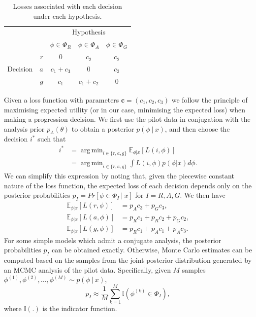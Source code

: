 \documentclass[AMA,STIX1COL]{WileyNJD-v2}
\DeclareMathOperator*{\argmin}{arg\,min}
\begin{document}
\begin{table}
\caption{Losses associated with each decision under each hypothesis.}
\centering
\begin{tabular}{r r c c c}
\toprule
& & \multicolumn{3}{c}{Hypothesis} \\
& & $\phi \in \Phi_{R}$ & $\phi \in \Phi_{A}$ & $\phi \in \Phi_{G}$ \\
\midrule
\multirow{3}{*}{Decision} & $r$ & 0 & $c_{2}$ & $c_{2}$ \\
 & $a$ & $c_{1} + c_{3}$ & 0 & $c_{3}$ \\
 & $g$ & $c_{1}$ & $c_{1} + c_{2}$ & 0  \\
\bottomrule
\end{tabular}
\label{tab:loss}
\end{table}


Given a loss function with parameters $\mathbf{c} = (c_1, c_2, c_3)$ we follow the principle of maximising expected utility (or in our case, minimising the expected loss) when making a progression decision. We first use the pilot data in conjugation with the analysis prior $p_{A}(\theta)$ to obtain a posterior $p(\phi ~|~ x)$, and then choose the decision $i^{*}$ such that 
\begin{align}
i^{*} & = \argmin_{i \in \{r,a,g\}} \mathbb{E}_{\phi | x} [ L(i, \phi) ] \\
 & = \argmin_{i \in \{r,a,g\}} \int L(i, \phi) p(\phi | x) d\phi.
\end{align}
We can simplify this expression by noting that, given the piecewise constant nature of the loss function, the expected loss of each decision depends only on the posterior probabilities $p_{I} =  Pr[\phi \in \Phi_{I} ~|~ x]$ for $I = R, A, G$. We then have
\begin{align}\label{eqn:exp_loss}
\mathbb{E}_{\phi | x} [ L(r, \phi) ] & = p_{A}c_{3} + p_{G}c_{3}, \\
\mathbb{E}_{\phi | x} [ L(a, \phi) ] & = p_{R}c_{1} + p_{R}c_{2} + p_{G}c_{2}, \\
\mathbb{E}_{\phi | x} [ L(g, \phi) ] & = p_{R}c_{1} + p_{A}c_{1} + p_{A}c_{3}.
\end{align}
For some simple models which admit a conjugate analysis, the posterior probabilities $p_I$ can be obtained exactly. Otherwise, Monte Carlo estimates can be computed based on the samples from the joint posterior distribution generated by an MCMC analysis of the pilot data. Specifically, given $M$ samples $\phi^{(1)}, \phi^{(2)}, \ldots , \phi^{(M)} \sim p(\phi ~|~ x)$, 
\begin{equation}
p_I \approx \frac{1}{M} \sum_{k = 1}^{M}  \mathbb{I}(\phi^{(k)} \in \Phi_I),
\end{equation}
where $\mathbb{I}(.)$ is the indicator function.
\end{document}
